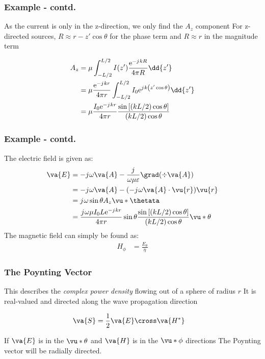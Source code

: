 \documentclass[10pt, compress]{beamer}
\renewcommand{\O}{\omega}  %
\newcommand{\E}{\varepsilon}  %
\renewcommand{\u}{\mu}  %
\newcommand{\e}{\mathrm{e}} %
\renewcommand{\j}{{j}\mkern1mu} %
\begin{document}
\begin{frame}
  \frametitle{Example - contd.}
  \begin{outline}
    \1 As the current is only in the z-direction, we only find the $A_z$ component
    \1 For z-directed sources, $R \approx r - z' \cos \theta$ for the phase term and $R \approx r$ in the magnitude term
  \end{outline}
\begin{align*}
  A_z &= \u \int_{-L/2}^{L/2} I(z') \frac{\e^{-\j k R}}{4 \pi R} \dd{z'} \\
  &= \u \frac{\e^{-\j k r}}{4 \pi r} \int_{-L/2}^{L/2} I_0 \e^{\j k \left(z' \cos \theta\right)} \dd{z'} \\
  &= \u \frac{I_0 \e^{-\j k r}}{4 \pi r} \frac{\sin \left[(kL/2)\cos \theta\right]}{(kL/2)\cos \theta}
\end{align*}
\end{frame}

\begin{frame}
  \frametitle{Example - contd.}
   The electric field is given as:
\begin{align*}
  \va{E} &= - \j \O \va{A} - \frac{\j}{\O \u \E} \grad(\div \va{A}) \\
  &= - \j \O \va{A} - (- \j \O \va{A} \cdot \vu{r})\vu{r} \\
  &= \j \O \sin \theta A_z \vu*{\thetata} \\
  &= \frac{\j \O \u I_{0} L \e^{-\j k r}}{4 \pi r} \sin \theta \frac{\sin \left[(k L / 2) \cos \theta\right]}{(k L / 2) \cos \theta} \vu*{\theta}
\end{align*}
The magnetic field can simply be found as:
\begin{align*}
  H_{\phi} &= \frac{E_{\theta}}{\eta}
\end{align*}
\end{frame}

\begin{frame}
  \frametitle{The Poynting Vector}
  \begin{outline}
    \1 This describes the \textit{complex power density} flowing out of a sphere of radius $r$
    \1 It is real-valued and directed along the wave propagation direction
  \end{outline}
  \begin{align*}
    \va{S} &= \frac{1}{2} \va{E} \cross \va{H^{*}}
  \end{align*}
  \begin{outline}
    \1 If $\va{E}$ is in the $\vu*{\theta}$ and $\va{H}$ is in the $\vu*{\phi}$ directions
    \1 The Poynting vector will be radially directed.
  \end{outline}
\end{frame}
\end{document}
